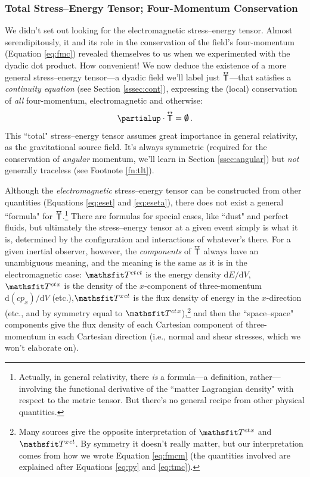 \documentclass[12pt]{article}
\newcommand{\dd}[1]{\mathrm{d}#1}
\newcommand{\tightoverset}[2]{%
  \mathop{#2}\limits^{\vbox to -.5ex{\kern-0.75ex\hbox{$#1$}\vss}}}
\newcommand{\inlinedy}[1]{\tightoverset{\text{\tiny$\bm\leftrightarrow$}}{#1}}
\newcommand{\capdy}[1]{ \overset{ \text{\tiny$\bm\leftrightarrow$} }{\vphantom{\text{\small{A}}}\smash{#1}} }
\begin{document}
\subsubsection{Total Stress--Energy Tensor; Four-Momentum Conservation}\label{sssec:tset}

We didn't set out looking for the electromagnetic stress--energy tensor. Almost serendipitously, it and its role in the conservation of the field's four-momentum (Equation \ref{eq:fmc}) revealed themselves to us when we experimented with the dyadic dot product. How convenient! We now deduce the existence of a more general stress--energy tensor---a dyadic field we'll label just ${\inlinedy{\mathsf{T}}}$---that satisfies a \emph{continuity equation} (see Section \ref{sssec:cont}), expressing the (local) conservation of \emph{all} four-momentum, electromagnetic and otherwise:
\begin{equation}\label{eq:set}
\partialup \cdot \capdy{\mathsf{T}} = \textrm{\mbox{\boldmath $\emptyset$}} \, .
\end{equation}
This ``total" stress--energy tensor assumes great importance in general relativity, as the gravitational source field. It's always symmetric (required for the conservation of \emph{angular} momentum, we'll learn in Section \ref{ssec:angular}) but \emph{not} generally traceless (see Footnote \ref{fn:tlt}).

Although the \emph{electromagnetic} stress--energy tensor can be constructed from other quantities (Equations \ref{eq:eset} and \ref{eq:eseta}), there does not exist a general ``formula" for ${\inlinedy{\mathsf{T}}}$.\footnote{\label{fn:setgr}Actually, in general relativity, there \emph{is} a formula---a definition, rather---involving the functional derivative of the ``matter Lagrangian density" with respect to the metric tensor. But there's no general recipe from other physical quantities.} There are formulas for special cases, like ``dust" and perfect fluids, but ultimately the stress--energy tensor at a given event simply is what it is, determined by the configuration and interactions of whatever's there. For a given inertial observer, however, the \emph{components} of ${\inlinedy{\mathsf{T}}}$ always have an unambiguous meaning, and the meaning is the same as it is in the electromagnetic case: $\mathsfit T^{ct \mkern1.5mu ct}$ is the energy density $\dd E / \dd V$, $\mathsfit T^{ct \mkern1.5mu x}$ is the density of the $x$-component of three-momentum $\dd (c p_x) / \dd V$ (etc.),$\mathsfit T^{x \mkern1.5mu ct}$ is the flux density of energy in the $x$-direction (etc., and by symmetry equal to $\mathsfit T^{ct \mkern1.5mu x}$),\footnote{Many sources give the opposite interpretation of $\mathsfit T^{ct \mkern1.5mu x}$ and $\mathsfit T^{x \mkern1.5mu ct}$. By symmetry it doesn't really matter, but our interpretation comes from how we wrote Equation \ref{eq:fmcm} (the quantities involved are explained after Equations \ref{eq:py} and \ref{eq:tmc}).} and then the ``space--space" components give the flux density of each Cartesian component of three-momentum in each Cartesian direction (i.e., normal and shear stresses, which we won't elaborate on).
\end{document}
